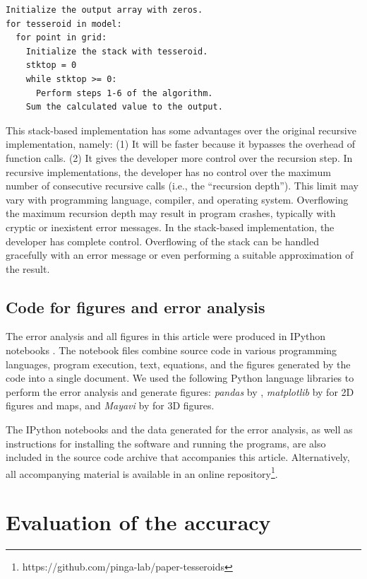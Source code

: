 \documentclass[paper,twocolumn,twoside]{geophysics}
\begin{document}
\begin{verbatim}
Initialize the output array with zeros.
for tesseroid in model:
  for point in grid:
    Initialize the stack with tesseroid.
    stktop = 0
    while stktop >= 0:
      Perform steps 1-6 of the algorithm.
    Sum the calculated value to the output.
\end{verbatim}

This stack-based implementation
has some advantages over the original recursive implementation,
namely:
(1) It will be faster because it bypasses the overhead of function calls.
(2) It gives the developer more control over the recursion step.
In recursive implementations,
the developer has no control over
the maximum number of consecutive recursive calls
(i.e., the ``recursion depth'').
This limit may vary with programming language,
compiler, and operating system.
Overflowing the maximum recursion depth
may result in program crashes,
typically with cryptic or inexistent error messages.
In the stack-based implementation,
the developer has complete control.
Overflowing of the stack can be handled gracefully
with an error message
or even performing a suitable approximation of the result.

\subsection{Code for figures and error analysis}


The error analysis and all figures in this article
were produced in IPython notebooks
\citep{Perez2007}.
The notebook files combine source code in various programming languages,
program execution,
text, equations,
and the figures generated by the code
into a single document.
We used the following Python language libraries
to perform the error analysis and generate figures:
\emph{pandas} by \citet{Mckinney2010},
\emph{matplotlib} by \citet{Hunter2007} for 2D figures and maps,
and \emph{Mayavi} by \citet{Ramachandran2011} for 3D figures.

The IPython notebooks
and the data generated for the error analysis,
as well as instructions for installing the software
and running the programs,
are also included in
the source code archive that accompanies this article.
Alternatively,
all accompanying material is available
in an online repository\footnote{
https://github.com/pinga-lab/paper-tesseroids}.



\section{Evaluation of the accuracy}
\end{document}
